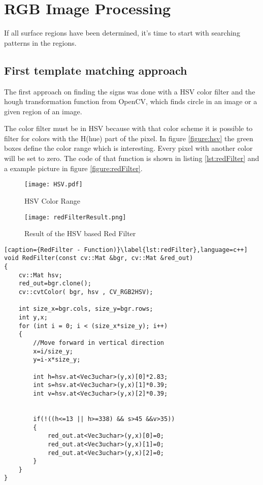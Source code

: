 \section{RGB Image Processing}

If all surface regions have been determined, it's time to start with searching patterns in the
regions. 

\subsection{First template matching approach}
The first approach on finding the signs was done with a HSV color filter and the hough transformation
function from OpenCV, which finds circle in an image or a given region of an image.

The color filter must be in HSV because with that color scheme it is possible to filter for colors
with the H(hue) part of the pixel. In figure \vref{figure:hsv} the green boxes define the color range
which is interesting. Every pixel with another color will be set to zero. The code of that function is
shown in listing \vref{lst:redFilter} and a example picture in figure \vref{figure:redFilter}.

\begin{figure}[htp]
\begin{center}
  \texttt{[image: HSV.pdf]}
  \caption{HSV Color Range}
  \label{figure:hsv}
\end{center}
\end{figure}


\begin{figure}[htp]
\begin{center}
  \texttt{[image: redFilterResult.png]}
  \caption{Result of the HSV based Red Filter}
  \label{figure:redFilter}
\end{center}
\end{figure}


\begin{lstlisting}[caption={RedFilter - Function)}\label{lst:redFilter},language=c++]
void RedFilter(const cv::Mat &bgr, cv::Mat &red_out)
{
	cv::Mat hsv;
	red_out=bgr.clone();
	cv::cvtColor( bgr, hsv , CV_RGB2HSV);

	int size_x=bgr.cols, size_y=bgr.rows;
	int y,x;
	for (int i = 0; i < (size_x*size_y); i++)
	{
		//Move forward in vertical direction
		x=i/size_y;
		y=i-x*size_y;

		int h=hsv.at<Vec3uchar>(y,x)[0]*2.83;
		int s=hsv.at<Vec3uchar>(y,x)[1]*0.39;
		int v=hsv.at<Vec3uchar>(y,x)[2]*0.39;


		if(!((h<=13 || h>=338) && s>45 &&v>35))
		{
			red_out.at<Vec3uchar>(y,x)[0]=0;
			red_out.at<Vec3uchar>(y,x)[1]=0;
			red_out.at<Vec3uchar>(y,x)[2]=0;
		}
	}
}
\end{lstlisting}

